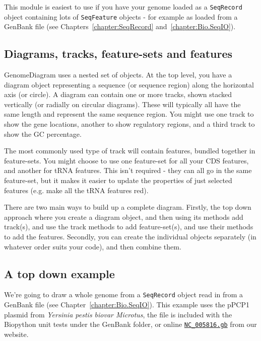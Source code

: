 \documentclass{report}
\begin{document}
This module is easiest to use if you have your genome loaded as a \verb|SeqRecord|
object containing lots of \verb|SeqFeature| objects - for example as loaded from a
GenBank file (see Chapters~\ref{chapter:SeqRecord} and~\ref{chapter:Bio.SeqIO}).

\subsection{Diagrams, tracks, feature-sets and features}

GenomeDiagram uses a nested set of objects.  At the top level, you have a diagram
object representing a sequence (or sequence region) along the horizontal axis (or
circle).  A diagram can contain one or more tracks, shown stacked vertically (or
radially on circular diagrams).  These will typically all have the same length
and represent the same sequence region.  You might use one track to show the gene
locations, another to show regulatory regions, and a third track to show the GC
percentage. %

The most commonly used type of track will contain features, bundled together in
feature-sets.  You might choose to use one feature-set for all your CDS features,
and another for tRNA features.  This isn't required - they can all go in the same
feature-set, but it makes it easier to update the properties of just selected
features (e.g. make all the tRNA features red).

There are two main ways to build up a complete diagram.  Firstly, the top down
approach where you create a diagram object, and then using its methods add
track(s), and use the track methods to add feature-set(s), and use their
methods to add the features.  Secondly, you can create the individual objects
separately (in whatever order suits your code), and then combine them.

\subsection{A top down example}
\label{sec:gd_top_down}

We're going to draw a whole genome from a \verb|SeqRecord| object read in from
a GenBank file (see Chapter~\ref{chapter:Bio.SeqIO}).  This example uses the
pPCP1 plasmid from \textit{Yersinia pestis biovar Microtus}, the file is
included with the Biopython unit tests under the GenBank folder, or online
\href{http://biopython.org/SRC/biopython/Tests/GenBank/NC_005816.gb}
{\texttt{NC\_005816.gb}} from our website.
\end{document}
